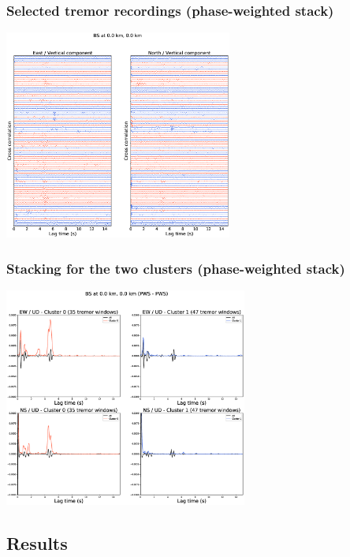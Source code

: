 \documentclass{beamer}
\begin{document}
	\begin{frame}
		\frametitle{Selected tremor recordings (phase-weighted stack)}
		\begin{center}
			\includegraphics[width=7.5cm, trim={5cm 2.5cm 5cm 4cm}, clip]{BS/BS_000_000_PWS_PWS_cluster_ccwin.eps}
		\end{center}
	\end{frame}

	\begin{frame}
		\frametitle{Stacking for the two clusters (phase-weighted stack)}
		\begin{center}
			\includegraphics[width=8cm, trim={4.5cm 2.5cm 5cm 4cm}, clip]{BS/BS_000_000_PWS_PWS_cluster_stackcc.eps}
		\end{center}
	\end{frame}


	\subsection{Results}
\end{document}
